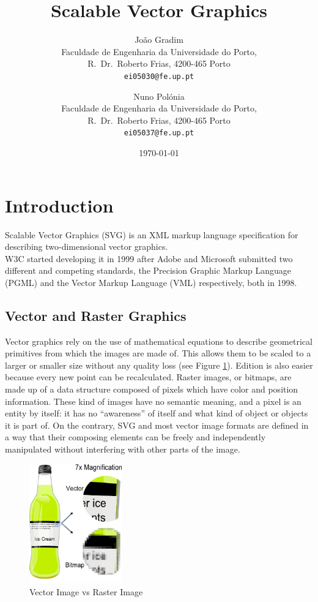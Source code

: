 \documentclass[twocolumn,twoside,10pt,a4paper]{article}
\title{Scalable Vector Graphics}
\author{João Gradim\\
\small Faculdade de Engenharia da Universidade do Porto,\\[-0.8ex]
\small R.\ Dr.\ Roberto Frias, 4200-465 Porto\\[-0.8ex]
\small \texttt{ei05030@fe.up.pt}\\
\and
Nuno Polónia\\
\small Faculdade de Engenharia da Universidade do Porto,\\[-0.8ex]
\small R.\ Dr.\ Roberto Frias, 4200-465 Porto\\[-0.8ex]
\small \texttt{ei05037@fe.up.pt}
}
\date{\today}
\begin{document}
\maketitle
\thispagestyle{plain}

\begin{abstract}
\end{abstract}

\section{Introduction}\label{sec:intro}
Scalable Vector Graphics (SVG) is an XML markup language specification for describing two-dimensional vector graphics.\\
W3C started developing it in 1999 after Adobe and Microsoft submitted two different and competing standards, the Precision Graphic Markup Language (PGML) and the Vector Markup Language (VML) respectively, both in 1998.\\

\subsection{Vector and Raster Graphics}
Vector graphics rely on the use of mathematical equations to describe geometrical primitives from which the images are made of. This allows them to be scaled to a larger or smaller size without any quality loss (see Figure \ref{fig:vector_vs_raster}). Edition is also easier because every new point can be recalculated. Raster images, or bitmaps, are made up of a data structure composed of pixels which have color and position information. These kind of images have no semantic meaning, and a pixel is an entity by itself: it has no ``awareness'' of itself and what kind of object or objects it is part of. On the contrary, SVG and most vector image formats are defined in a way that their composing elements can be freely and independently manipulated without interfering with other parts of the image.

\begin{figure}[h]
	\centering
	\includegraphics[width=40mm]{images/vector_bitmap.png}
	\caption{Vector Image vs Raster Image}
	\label{fig:vector_vs_raster}
\end{figure}
\end{document}
